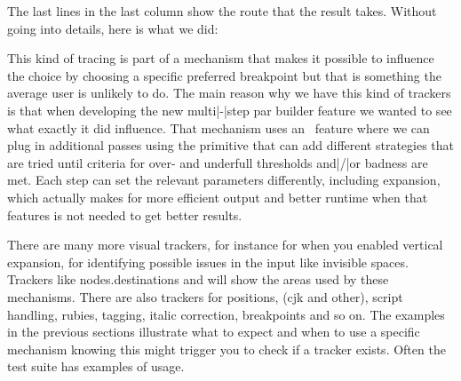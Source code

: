 \showbreakpoints%

The last lines in the last column show the route that the result takes. Without
going into details, here is what we did:

\starttyping
\startshowbreakpoints
\stopshowbreakpoints

\showbreakpoints
\stoptyping

This kind of tracing is part of a mechanism that makes it possible to influence
the choice by choosing a specific preferred breakpoint but that is something the
average user is unlikely to do. The main reason why we have this kind of trackers
is that when developing the new multi|-|step par builder feature we wanted to see
what exactly it did influence. That mechanism uses an \LUAMETATEX\ feature where
we can plug in additional passes using the \type {\parpasses} primitive that can
add different strategies that are tried until criteria for over- and underfull
thresholds and|/|or badness are met. Each step can set the relevant parameters
differently, including expansion, which actually makes for more efficient output
and better runtime when that features is not needed to get better results.

\stopsectionlevel

\startsectionlevel[title=More]

There are many more visual trackers, for instance  for when you
enabled vertical expansion,  for identifying possible
issues in the input like invisible spaces. Trackers like \typ
{nodes.destinations} and  will show the areas used by
these mechanisms. There are also trackers for positions, (cjk and other), script
handling, rubies, tagging, italic correction, breakpoints and so on. The examples
in the previous sections illustrate what to expect and when to use a specific
mechanism knowing this might trigger you to check if a tracker exists. Often the
test suite has examples of usage.

\stopsectionlevel

\stopdocument

